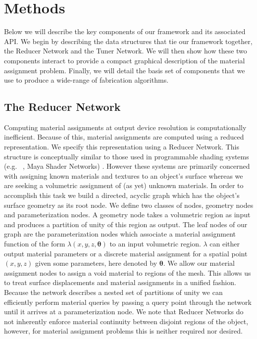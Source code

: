 \documentclass[annual]{acmsiggraph}
\begin{document}
\section{Methods}
Below we will describe the key components of our framework and its associated API. We begin by describing the data structures that tie our framework together, the Reducer Network and the Tuner Network. We will then show how these two components interact to provide a compact graphical description of the material assignment problem. Finally, we will detail the basis set of components that we use to produce a wide-range of fabrication algorithms.
\subsection{The Reducer Network}
Computing material assignments at output device resolution is computationally inefficient. Because of this, material assignments are computed  using a reduced representation. We specify this representation using a Reducer Network.  This structure is conceptually similar to those used in programmable shading systems (e.g. ~\cite{Cook1984}, Maya Shader Networks) . However these systems are primarily concerned with assigning known materials and textures to an object's surface whereas we are seeking a volumetric assignment of (as yet) unknown materials. In order to accomplish this task we build a directed, acyclic graph which has the object's surface geometry as its root node. We define two classes of nodes, geometry nodes and parameterization nodes. A geometry node takes a volumetric region as input and produces a partition of unity of this region as output. The leaf nodes of our graph are the parameterization nodes which associate a material assignment function of the form $\lambda\left(x,y,z, \boldsymbol{\theta}\right)$ to an input volumetric region.
$\lambda$ can either output material parameters or a discrete material assignment for a spatial point $\left(x,y,z\right)$ given some parameters, here denoted by $ \boldsymbol{\theta}$. We allow our material assignment nodes to assign a void material to regions of the mesh. This allows us to treat surface displacements and material assignments in a unified fashion. Because the network describes a nested set of partitions of unity we can efficiently perform material queries by passing a query point through the network until it arrives at a parameterization node. We note that Reducer Networks do not inherently enforce material continuity between disjoint regions of the object, however, for material assignment problems this is neither required nor desired.
\end{document}
